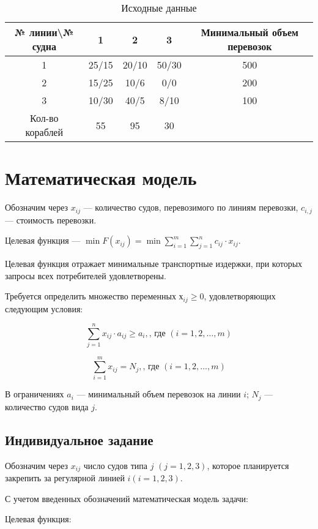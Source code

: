 \begin{table}[H]
	\centering
	\normalsize
	\caption{Исходные данные}
	\label{tbl:1}
	\begin{tabular}{|c|c|c|c|c|}
		\hline
		№ линии\textbackslash № судна&1&2&3&Минимальный объем перевозок\\ \hline
		1&25/15&20/10&50/30&500\\ \hline
		2&15/25&10/6&0/0&200\\ \hline
		3&10/30&40/5&8/10&100\\ \hline
		Кол-во кораблей&55&95&30&\\ \hline

\end{tabular}

\end{table}

\section{Математическая модель}


Обозначим через $x_{ij}$ --- количество судов, перевозимого по линиям перевозки, $c_{i,j}$ --- стоимость перевозки.

Целевая функция --- $\min F(x_{ij}) = \min\sum_{i=1}^{m}\sum_{j=1}^{n} c_{ij} \cdot x_{ij}$.

Целевая функция отражает минимальные транспортные издержки, при которых запросы всех потребителей удовлетворены.

Требуется определить множество переменных $х_{ij} \geqslant 0$, удовлетворяющих следующим условия:

$$\sum_{j=1}^{n} x_{ij} \cdot a_{ij} \geqslant a_i, \text{, где } (i = 1, 2, \dots , m)$$

$$\sum_{i=1}^{m} x_{ij} = N_j, \text{, где } (i = 1, 2, \dots , m)$$

В ограничениях $a_i$ --- минимальный объем перевозок на линии $i$; $N_j$ --- количество судов вида $j$.

\subsection{Индивидуальное задание}

Обозначим через $x_{ij}$ число судов типа $j$ $(j = 1,2,3)$, которое планируется закрепить за регулярной линией $i (i = 1,2,3)$.

С учетом введенных обозначений математическая модель задачи:

Целевая функция:



